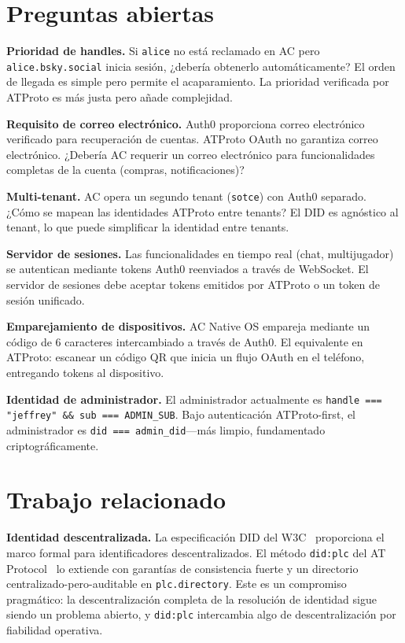 \documentclass[10pt,letterpaper,twocolumn]{article}
\begin{document}

\section{Preguntas abiertas}
\label{sec:questions}

\textbf{Prioridad de handles.} Si \texttt{alice} no está reclamado en AC pero \texttt{alice.bsky.social} inicia sesión, ¿debería obtenerlo automáticamente? El orden de llegada es simple pero permite el acaparamiento. La prioridad verificada por ATProto es más justa pero añade complejidad.

\textbf{Requisito de correo electrónico.} Auth0 proporciona correo electrónico verificado para recuperación de cuentas. ATProto OAuth no garantiza correo electrónico. ¿Debería AC requerir un correo electrónico para funcionalidades completas de la cuenta (compras, notificaciones)?

\textbf{Multi-tenant.} AC opera un segundo tenant (\texttt{sotce}) con Auth0 separado. ¿Cómo se mapean las identidades ATProto entre tenants? El DID es agnóstico al tenant, lo que puede simplificar la identidad entre tenants.

\textbf{Servidor de sesiones.} Las funcionalidades en tiempo real (chat, multijugador) se autentican mediante tokens Auth0 reenviados a través de WebSocket. El servidor de sesiones debe aceptar tokens emitidos por ATProto o un token de sesión unificado.

\textbf{Emparejamiento de dispositivos.} AC Native OS empareja mediante un código de 6 caracteres intercambiado a través de Auth0. El equivalente en ATProto: escanear un código QR que inicia un flujo OAuth en el teléfono, entregando tokens al dispositivo.

\textbf{Identidad de administrador.} El administrador actualmente es \texttt{handle === "jeffrey" \&\& sub === ADMIN\_SUB}. Bajo autenticación ATProto-first, el administrador es \texttt{did === admin\_did}---más limpio, fundamentado criptográficamente.


\section{Trabajo relacionado}
\label{sec:related}

\textbf{Identidad descentralizada.} La especificación DID del W3C~\citep{w3cdid2022} proporciona el marco formal para identificadores descentralizados. El método \texttt{did:plc} del AT Protocol~\citep{atproto2024did} lo extiende con garantías de consistencia fuerte y un directorio centralizado-pero-auditable en \texttt{plc.directory}. Este es un compromiso pragmático: la descentralización completa de la resolución de identidad sigue siendo un problema abierto, y \texttt{did:plc} intercambia algo de descentralización por fiabilidad operativa.
\end{document}
